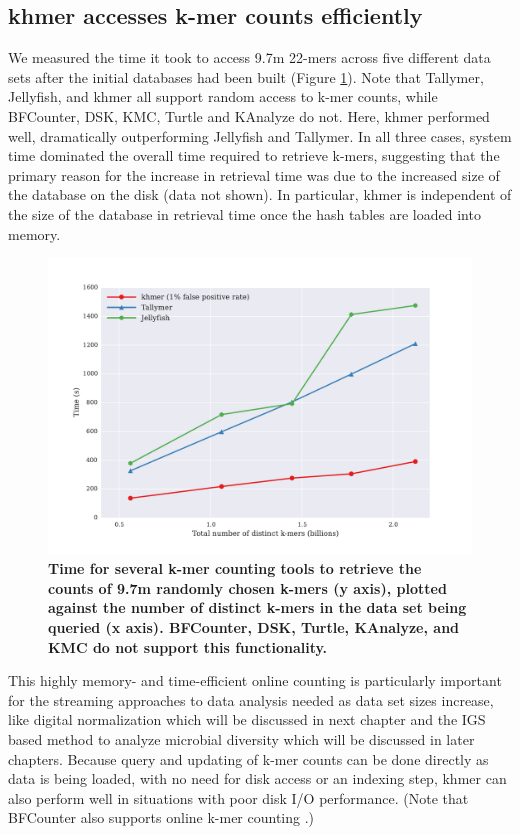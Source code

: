 \subsection{khmer accesses k-mer counts efficiently}

We measured the time it took to access 9.7m 22-mers across five
different data sets after the initial databases had been built (Figure
\ref{fig:cmp_count}).  Note that Tallymer, Jellyfish, and khmer all
support random access to k-mer counts, while BFCounter, DSK, KMC, Turtle and 
KAnalyze do not. Here, khmer
performed well, dramatically outperforming Jellyfish and Tallymer.  In
all three cases, system time dominated the overall time required to
retrieve k-mers, suggesting that the primary reason for the increase
in retrieval time was due to the increased size of the database on the
disk (data not shown).  In particular, khmer is independent of the
size of the database in retrieval time once the hash tables are loaded
into memory. 


\begin{figure}[!ht]
\centerline{\includegraphics[width=5in]{./figures/figure4_count_benchmark}}
\caption{\bf Time for several k-mer counting tools to retrieve the
  counts of 9.7m randomly chosen k-mers (y axis), plotted against the
  number of distinct k-mers in the data set being queried (x axis).
  BFCounter, DSK, Turtle, KAnalyze, and KMC do not support this functionality.}
\label{fig:cmp_count}
\end{figure}


This highly  memory- and time-efficient online counting is particularly 
important for the streaming approaches to data
analysis needed as data set sizes increase, like digital normalization which 
will be discussed in next chapter and the IGS based method to analyze 
microbial diversity which will be discussed in later chapters.  Because query and
updating of k-mer counts can be done directly as data is being loaded,
with no need for disk access or an indexing step, khmer can also
perform well in situations with poor disk I/O performance.  (Note that
BFCounter also supports online k-mer counting \cite{Melsted2011}.)



